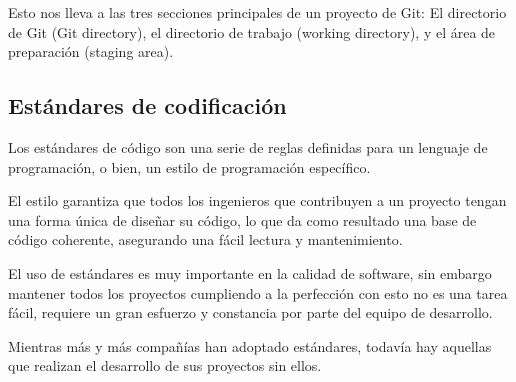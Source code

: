 \documentclass{article}
\begin{document}
Esto nos lleva a las tres secciones principales de un proyecto de Git: El directorio de Git (Git directory), el directorio de trabajo (working directory), y el área de preparación (staging area).

\subsection{Estándares de codificación}
Los estándares de código son una serie de reglas definidas para un lenguaje de programación, o bien, un estilo de programación específico.

El estilo garantiza que todos los ingenieros que contribuyen a un proyecto tengan una forma única de diseñar su código, lo que da como resultado una base de código coherente, asegurando una fácil lectura y mantenimiento.

El uso de estándares es muy importante en la calidad de software, sin embargo mantener todos los proyectos cumpliendo a la perfección con esto no es una tarea fácil, requiere un gran esfuerzo y constancia por parte del equipo de desarrollo.

Mientras más y más compañías han adoptado estándares, todavía hay aquellas que realizan el desarrollo de sus proyectos sin ellos.
\end{document}
